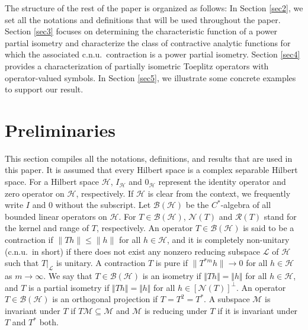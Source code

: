 \documentclass[12pt]{amsart}
\newcommand{\clb}{\mathcal{B}}
\newcommand{\clh}{\mathcal{H}}
\newcommand{\cll}{\mathcal{L}}
\newcommand{\clm}{\mathcal{M}}
\newcommand{\cln}{\mathcal{N}}
\newcommand{\clr}{\mathcal{R}}
\theoremstyle{definition}
\theoremstyle{plain}
\theoremstyle{definition}
\numberwithin{equation}{section}
\begin{document}
The structure of the rest of the paper is organized as follows: In Section \ref{sec2}, we set all the notations and definitions that will be used throughout the paper. Section \ref{sec3} focuses on  determining the characteristic function of a power partial isometry and characterize the class of contractive analytic functions for which the associated c.n.u.\ contraction is a power partial isometry. Section \ref{sec4} provides a characterization of partially isometric Toeplitz operators with operator-valued symbols. In Section \ref{sec5}, we illustrate some concrete examples to support our result.
 


\section{Preliminaries}{\label{sec2}}

This section compiles all the notations, definitions, and results that are used in this paper. It is assumed that every Hilbert space is a complex separable Hilbert space. For a Hilbert space $\clh$, $I_\clh$ and $0_\clh$  represent the identity operator and zero operator on $\clh$, respectively. If $\clh$ is clear from the context, we frequently write $I$ and $0$ without the subscript. Let $\clb(\clh)$ be the $C^*$-algebra of all bounded linear operators on $\clh$. For $T \in \clb(\clh)$, $\cln(T)$ and $\clr(T)$ stand for the kernel and range of $T$, respectively. An operator $T \in \clb(\clh)$ is said to be a contraction if $\|Th\|\leq \|h\| $ for all $h \in \clh$, and it is  completely non-unitary (c.n.u.\ in short) if there does not exist any nonzero reducing subspace $\cll$ of $\clh$ such that $T|_{\cll}$ is unitary. A contraction $T$ is pure if $\|T^{*m}h\| \rightarrow 0$ for all $h \in \clh$ as $m \rightarrow \infty$. We say that $T \in\mathcal{B(H)}$ is an isometry if  $\Vert Th \Vert=\Vert h\Vert $ for all $h \in \mathcal{H}$, and $T$ is a partial isometry if $\Vert Th\Vert=\Vert h \Vert$ for all $h \in [\cln (T)]^\perp$. An operator $T \in \clb(\clh)$ is an orthogonal projection if $T=T^2=T^*$. A subspace $\clm$ is invariant under $T$ if $T\clm \subseteq \clm$ and $\clm$ is reducing under $T$ if it is invariant under $T$ and $T^*$ both. 
\end{document}
